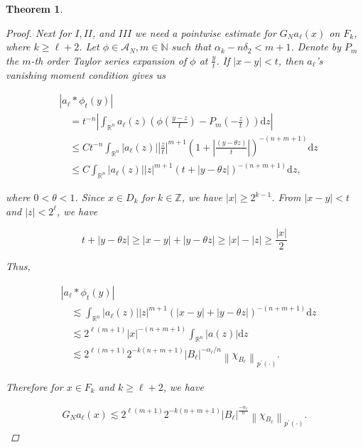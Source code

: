 \documentclass[oneside,reqno]{amsart}
\newtheorem{theorem}{Theorem}[section]
\numberwithin{equation}{section}
\theoremstyle{definition}
\begin{document}
\begin{theorem}
\begin{proof}
Next for $I, I I$, and $I I I$ we need a pointwise estimate for $G_{N} a_\ell (x)$ on $F_{k}$, where $k \geqslant \ell+2$. Let $\phi \in \mathcal{A}_{N}, m \in \mathbb{N}$ such that $\alpha_{k}-n \delta_{2}<m+1$. Denote by $P_{m}$ the $m$-th order Taylor series expansion of $\phi$ at $\frac{y}{t}$. If $|x-y|<t$, then $a_\ell$'s vanishing moment condition gives us


\begin{align*}
& \left|a_\ell  * \phi_{t}(y)\right| \\
& \quad=t^{-n}\left|\int_{\mathbb{R}^{n}} a_\ell (z)\left(\phi\left(\frac{y-z}{t}\right)-P_{m}\left(-\frac{z}{t}\right)\right) \mathrm{d} z\right| \\
& \quad \leq C t^{-n} \int_{\mathbb{R}^{n}}\left|a_\ell (z)\right|\left|\frac{z}{t}\right|^{m+1}\left(1+\left|\frac{(y-\theta z)}{t}\right|\right)^{-(n+m+1)} \mathrm{d} z \\
& \quad \leq C \int_{\mathbb{R}^{n}}\left|a_\ell (z)\right||z|^{m+1}(t+|y-\theta z|)^{-(n+m+1)} \mathrm{d} z,
\end{align*}


where $0<\theta<1$. Since $x \in D_{k}$ for $k \in \mathbb{Z}$, we have $|x| \geqslant 2^{k-1}$. From $|x-y|<t$ and $|z|<2^{\ell}$, we have


\begin{equation*}
t+|y-\theta z| \geqslant|x-y|+|y-\theta z| \geqslant|x|-|z| \geqslant \frac{|x|}{2}
\end{equation*}


Thus,


\begin{align*}
& \left|a_\ell  * \phi_{t}(y)\right| \\
& \quad \lesssim \int_{\mathbb{R}^{n}}\left|a_\ell (z)\right||z|^{m+1}(|x-y|+|y-\theta z|)^{-(n+m+1)} \mathrm{d} z \\
& \quad \lesssim 2^{\ell(m+1)}|x|^{-(n+m+1)} \int_{\mathbb{R}^{n}}|a(z)| \mathrm{d} z  \\
& \quad \lesssim 2^{\ell(m+1)} 2^{-k(n+m+1)}\left|B_\ell \right|^{-\alpha_\ell  / n}\left\|\chi_{B_\ell }\right\|_{{p^{\prime}(\cdot)}} .
\end{align*}


Therefore for $x \in F_{k}$ and $k\geq \ell+2$, we have

\[
\begin{array}{r}
G_{N} a_\ell (x) \lesssim 2^{\ell(m+1)} 2^{-k(n+m+1)}\left|B_\ell \right|^{\frac{-\alpha_\ell  } {n}}\left\|\chi_{B_\ell }\right\|_{{p^{\prime}(\cdot)}}.
\end{array}
\]


\end{proof}
\end{theorem}
\end{document}
